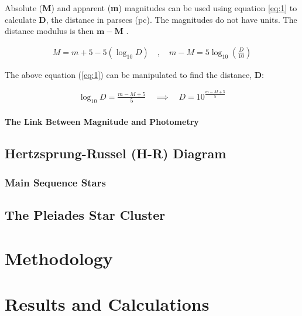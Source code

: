 \documentclass[12pt]{article}
\begin{document}
Absolute (\textbf{M}) and apparent (\textbf{m}) magnitudes can be used using equation \ref{eq:1} to calculate \textbf{D}, the distance in parsecs (pc). The magnitudes do not have units.
The distance modulus is then $\mathbf{m - M}$
\cite{cosmosabsmag}.

\begin{gather} \label{eq:1}
    M = m + 5 - 5 (\log_{10} D) \quad , \quad m - M = 5 \log_{10} \left( \frac{D}{10} \right)
\end{gather}

The above equation (\ref{eq:1}) can be manipulated to find the distance, \textbf{D}:

\begin{gather} \label{eq:2}
    \log_{10}D = \frac{m - M + 5}{5} \quad \implies \quad D = 10^{\frac{m - M + 5}{5}}
\end{gather}

\paragraph{The Link Between Magnitude and Photometry}



\subsection{Hertzsprung-Russel (H-R) Diagram}



\subsubsection{Main Sequence Stars}



\subsection{The Pleiades Star Cluster}



\section{Methodology} \label{sec:2}



\section{Results and Calculations} \label{sec:3}
\end{document}
